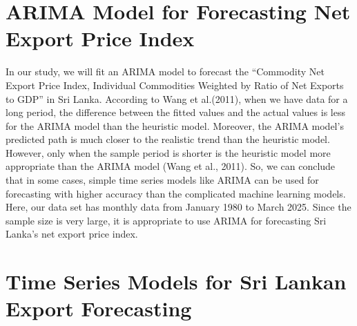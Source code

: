 \documentclass[12pt,a4paper]{report} %
\begin{document}
	\section{ARIMA Model for Forecasting Net Export Price Index}
	
	In our study, we will fit an ARIMA model to forecast the ``Commodity Net Export Price Index, Individual Commodities Weighted by Ratio of Net Exports to GDP'' in Sri Lanka. According to Wang et al.(2011), when we have data for a long period, the difference between the fitted values and the actual values is less for the ARIMA model than the heuristic model. Moreover, the ARIMA model’s predicted path is much closer to the realistic trend than the heuristic model. However, only when the sample period is shorter is the heuristic model more appropriate than the ARIMA model (Wang et al., 2011). So, we can conclude that in some cases, simple time series models like ARIMA can be used for forecasting with higher accuracy than the complicated machine learning models. Here, our data set has monthly data from January 1980 to March 2025. Since the sample size is very large, it is appropriate to use ARIMA for forecasting Sri Lanka’s net export price index. 
	
	\section{Time Series Models for Sri Lankan Export Forecasting}
	
\end{document}
